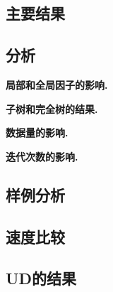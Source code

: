 \subsection{主要结果}



\subsection{分析}

\noindent\textbf{局部和全局因子的影响.}

\noindent\textbf{子树和完全树的结果.}

\noindent\textbf{数据量的影响.}

\noindent\textbf{迭代次数的影响.}

\subsection{样例分析}

\subsection{速度比较}

\subsection{UD的结果}
